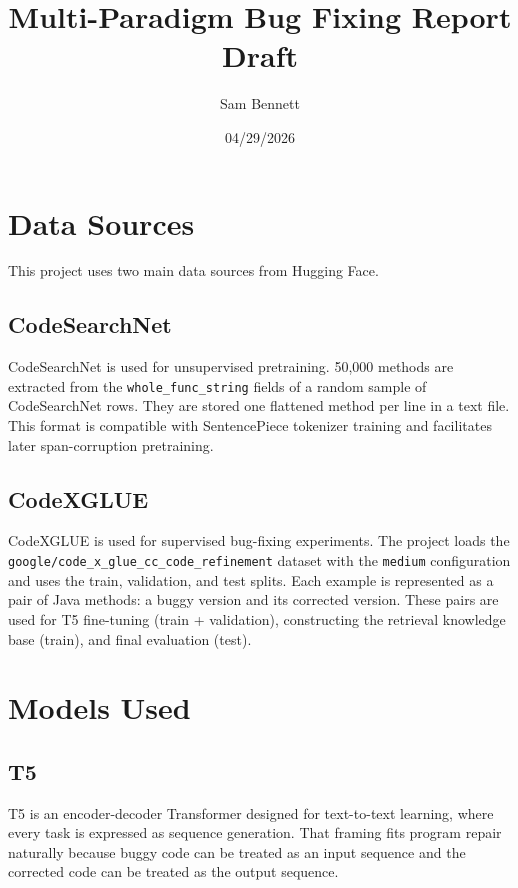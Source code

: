 \documentclass[11pt]{article}
\title{Multi-Paradigm Bug Fixing Report Draft}
\author{Sam Bennett}
\date{04/29/2026}
\begin{document}
\maketitle

\section{Data Sources}
This project uses two main data sources from Hugging Face.

\subsection{CodeSearchNet}
CodeSearchNet is used for unsupervised pretraining. 50{,}000 methods are extracted from the \texttt{whole\_func\_string} fields of a random sample of CodeSearchNet rows. They are stored one flattened method per line in a text file. This format is compatible with SentencePiece tokenizer training and facilitates later span-corruption pretraining.

\subsection{CodeXGLUE}
CodeXGLUE is used for supervised bug-fixing experiments. The project loads the \texttt{google/code\_x\_glue\_cc\_code\_refinement} dataset with the \texttt{medium} configuration and uses the train, validation, and test splits. Each example is represented as a pair of Java methods: a buggy version and its corrected version. These pairs are used for T5 fine-tuning (train + validation), constructing the retrieval knowledge base (train), and final evaluation (test).

\section{Models Used}
\subsection{T5}
T5 is an encoder-decoder Transformer designed for text-to-text learning, where every task is expressed as sequence generation. That framing fits program repair naturally because buggy code can be treated as an input sequence and the corrected code can be treated as the output sequence.
\end{document}
